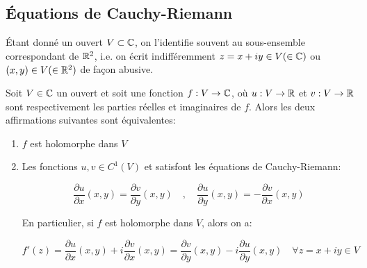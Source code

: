 \subsection{Équations de Cauchy-Riemann}

\begin{remark}
    Étant donné un ouvert $V \subset \mathbb{C}$, on l'identifie souvent au sous-ensemble correspondant de $\mathbb{R}^2$, i.e. on écrit indifféremment $z = x + iy \in V (\in \mathbb{C})$ ou $(x,y) \in V (\in \mathbb{R}^2)$ de façon abusive.
\end{remark}

\newpage

\begin{theorem}
    Soit $V \in \mathbb{C}$ un ouvert et soit une fonction $f: V \rightarrow \mathbb{C}$, où $u: V \rightarrow \mathbb{R}$ et $v: V \rightarrow \mathbb{R}$ sont respectivement les parties réelles et imaginaires de $f$.
    Alors les deux affirmations suivantes sont équivalentes:
    \begin{enumerate}[label=\arabic{enumi})]
        \item 
        $f$ est holomorphe dans $V$
        \item 
        Les fonctions $u,v \in C^1(V)$ et satisfont les équations de Cauchy-Riemann:
        
        \[
        \frac{\partial u}{\partial x}(x,y) = \frac{\partial v}{\partial y}(x,y)
        \quad,\quad
        \frac{\partial u}{\partial y}(x,y) = - \frac{\partial v}{\partial x}(x,y)
        \]
        
        En particulier, si $f$ est holomorphe dans $V$, alors on a:
        
        \[
        f'(z) = \frac{\partial u}{\partial x}(x,y) + i \frac{\partial v}{\partial x}(x,y) = \frac{\partial v}{\partial y}(x,y) - i \frac{\partial u}{\partial y}(x,y) \quad \forall z = x + iy \in V
        \]
    \end{enumerate}
\end{theorem}


